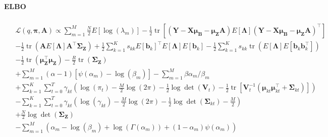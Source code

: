 \documentclass[11pt,authoryear]{article}
\DeclareMathOperator*{\tr}{tr}
\newcommand{\bs}[1]{\boldsymbol{#1}}
\begin{document}
\paragraph{ELBO}
\begin{align}
\begin{split}
&\mathcal{L}(q, \bs{\pi}, \bs{A}) \propto \sum_{m = 1}^M \frac{N}{2}E\left[\log(\lambda_m)\right] - \frac{1}{2}\tr\left[(\bs{Y}-\bs{X}\bs{\mu}_{\bs{B}}-\bs{\mu}_{\bs{Z}}\bs{A})E[\bs{\Lambda}](\bs{Y}-\bs{X}\bs{\mu}_{\bs{B}} - \bs{\mu}_{\bs{Z}}\bs{A})^{\intercal}\right]\\
& -\frac{1}{2}\tr\left(\bs{A}E[\bs{\Lambda}]\bs{A}^{\intercal}\bs{\Sigma}_{\bs{Z}}\right) + \frac{1}{2}\sum_{k = 1}^Ks_{kk}E\left[\bs{b}_{k}\right]^{\intercal}E[\bs{\Lambda}]E\left[\bs{b}_{k}\right] - \frac{1}{2}\sum_{k = 1}^Ks_{kk}\tr\left(E[\bs{\Lambda}]E\left[\bs{b}_{k}\bs{b}_{k}^{\intercal}\right]\right)\\
&- \frac{1}{2} \tr(\bs{\mu}_{\bs{Z}}^{\intercal}\bs{\mu}_{\bs{Z}}) - \frac{R}{2}\tr(\bs{\Sigma}_{\bs{Z}})\\
&+ \sum_{m = 1}^M (\alpha - 1)[\psi(\alpha_m) - \log(\beta_m)] - \sum_{m = 1}^M\beta \alpha_m/\beta_m\\
&+\sum_{k = 1}^K \sum_{t = 0}^T \gamma_{kt}\left(\log(\pi_t) - \frac{M}{2}\log(2\pi) - \frac{1}{2}\log\det(\bs{V}_t) - \frac{1}{2}\tr\left[\bs{V}_t^{-1}(\bs{\mu}_{kt}\bs{\mu}_{kt}^{\intercal} + \bs{\Sigma}_{kt})\right]\right)\\
&-\sum_{k = 1}^K \sum_{t = 0}^T \gamma_{kt}\left(\log(\gamma_{kt}) - \frac{M}{2}\log(2\pi) - \frac{1}{2}\log\det(\bs{\Sigma}_{kt}) - \frac{M}{2}\right)\\
&+\frac{N}{2}\log\det(\bs{\Sigma}_{\bs{Z}})\\
&-\sum_{m = 1}^M \left( \alpha_m - \log(\beta_m) + \log(\Gamma(\alpha_m)) + (1 - \alpha_m)\psi(\alpha_m)\right)
\end{split}
\end{align}
\end{document}
